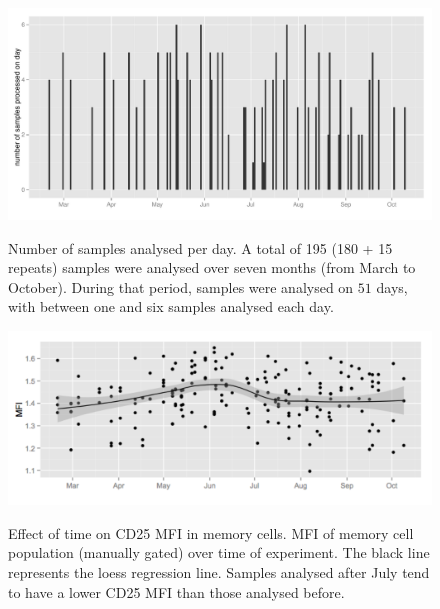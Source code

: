 \begin{figure}
\centering
\begin{minipage}{.65\textwidth}
\includegraphics[width=\linewidth]{figures/il2ra-samples-time}
\end{minipage}
{Number of samples analysed per day.}
{
A total of 195 (180 + 15 repeats) samples were analysed over seven months (from March to October).
During that period, samples were analysed on $51$ days,
with between one and six samples analysed each day.
}
\begin{minipage}{.65\textwidth}
\includegraphics[width=\linewidth]{figures/memory-CD25-MFI-time-effect}
\end{minipage}
{Effect of time on CD25 MFI in memory cells.}
{
 MFI of memory cell population (manually gated) over time of experiment.
The black line represents the loess regression line.
Samples analysed after July tend to have a lower CD25 MFI than those analysed before.
}
\end{figure}


